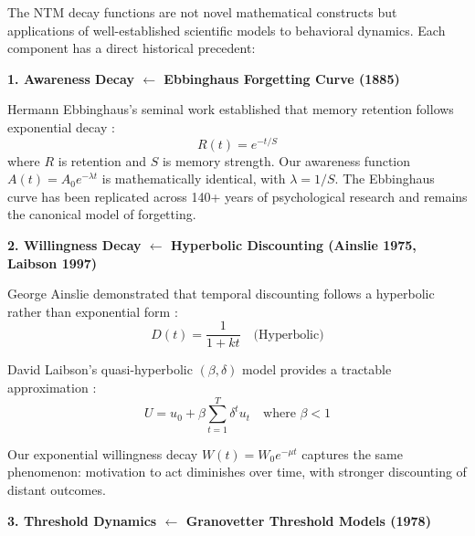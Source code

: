 \documentclass[11pt, a4paper]{article}
\begin{document}
\begin{tcolorbox}[colback=blue!5!white, colframe=blue!75!black,
    title=\textbf{Scientific Foundations: NTM in Historical Context}]

The NTM decay functions are not novel mathematical constructs but applications of well-established scientific models to behavioral dynamics. Each component has a direct historical precedent:

\vspace{0.5em}
\textbf{1. Awareness Decay $\leftarrow$ Ebbinghaus Forgetting Curve (1885)}

Hermann Ebbinghaus's seminal work established that memory retention follows exponential decay \citep{ebbinghaus1885memory}:
\begin{equation}
R(t) = e^{-t/S}
\end{equation}
where $R$ is retention and $S$ is memory strength. Our awareness function $A(t) = A_0 e^{-\lambda t}$ is mathematically identical, with $\lambda = 1/S$. The Ebbinghaus curve has been replicated across 140+ years of psychological research and remains the canonical model of forgetting.

\vspace{0.5em}
\textbf{2. Willingness Decay $\leftarrow$ Hyperbolic Discounting (Ainslie 1975, Laibson 1997)}

George Ainslie demonstrated that temporal discounting follows a hyperbolic rather than exponential form \citep{ainslie1975specious}:
\begin{equation}
D(t) = \frac{1}{1 + kt} \quad \text{(Hyperbolic)}
\end{equation}

David Laibson's quasi-hyperbolic $(\beta, \delta)$ model provides a tractable approximation \citep{laibson1997golden}:
\begin{equation}
U = u_0 + \beta \sum_{t=1}^{T} \delta^t u_t \quad \text{where } \beta < 1
\end{equation}

Our exponential willingness decay $W(t) = W_0 e^{-\mu t}$ captures the same phenomenon: motivation to act diminishes over time, with stronger discounting of distant outcomes.

\vspace{0.5em}
\textbf{3. Threshold Dynamics $\leftarrow$ Granovetter Threshold Models (1978)}


\end{tcolorbox}
\end{document}
